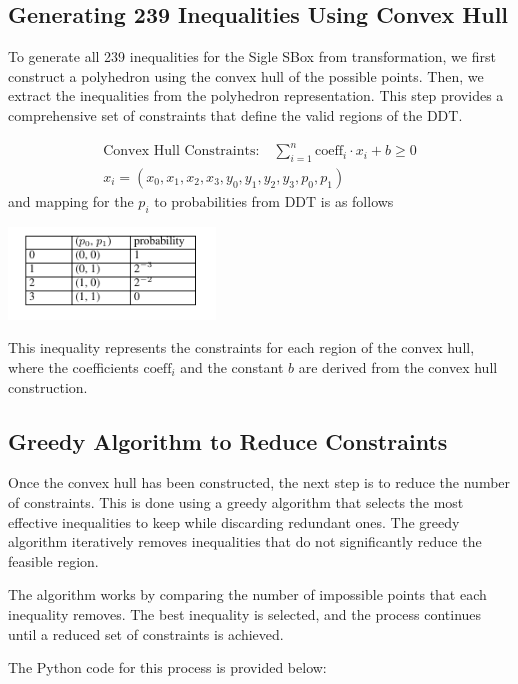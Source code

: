 \subsection*{Generating 239 Inequalities Using Convex Hull}
To generate all 239 inequalities for the Sigle SBox from transformation, we
first construct a polyhedron using the convex hull of the possible points. Then,
we extract the inequalities from the polyhedron representation. This step
provides a comprehensive set of constraints that define the valid regions of the
DDT.

\begin{align*}
    \text{Convex Hull Constraints:} \quad \sum_{i=1}^{n} \text{coeff}_i \cdot x_i + b \geq 0 \\
    x_i = (x_0,x_1,x_2,x_3,y_0,y_1,y_2,y_3,p_0,p_1)
\end{align*}
and mapping for the $p_i$ to probabilities from DDT is as follows

\begin{center}
    \includegraphics[width=5.5cm]{./images/table.png}
\end{center}

This inequality represents the constraints for each region of the convex hull,
where the coefficients \( \text{coeff}_i \) and the constant \( b \) are derived
from the convex hull construction.

\subsection*{Greedy Algorithm to Reduce Constraints}
Once the convex hull has been constructed, the next step is to reduce the number
of constraints. This is done using a greedy algorithm that selects the most
effective inequalities to keep while discarding redundant ones. The greedy
algorithm iteratively removes inequalities that do not significantly reduce the
feasible region.

The algorithm works by comparing the number of impossible points that each
inequality removes. The best inequality is selected, and the process continues
until a reduced set of constraints is achieved.

The Python code for this process is provided below:

